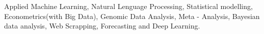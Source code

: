 


\begin{cvparagraph}
Applied Machine Learning, Natural Lenguage Processing, Statistical modelling, Econometrics(with Big Data), Genomic Data Analysis, Meta - Analysis, Bayesian data analysis, Web Scrapping, Forecasting and Deep Learning.

\end{cvparagraph}